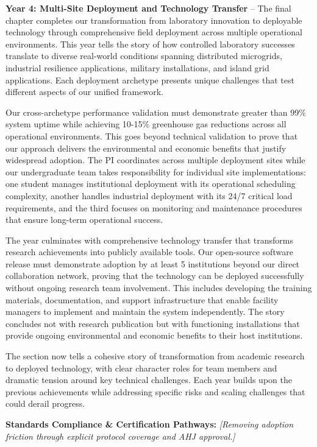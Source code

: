 \documentclass[12pt]{article}
\begin{document}
\textbf{Year 4: Multi-Site Deployment and Technology Transfer} – The final chapter completes our transformation from laboratory innovation to deployable technology through comprehensive field deployment across multiple operational environments. This year tells the story of how controlled laboratory successes translate to diverse real-world conditions spanning distributed microgrids, industrial resilience applications, military installations, and island grid applications. Each deployment archetype presents unique challenges that test different aspects of our unified framework.

Our cross-archetype performance validation must demonstrate greater than 99\% system uptime while achieving 10-15\% greenhouse gas reductions across all operational environments. This goes beyond technical validation to prove that our approach delivers the environmental and economic benefits that justify widespread adoption. The PI coordinates across multiple deployment sites while our undergraduate team takes responsibility for individual site implementations: one student manages institutional deployment with its operational scheduling complexity, another handles industrial deployment with its 24/7 critical load requirements, and the third focuses on monitoring and maintenance procedures that ensure long-term operational success.

The year culminates with comprehensive technology transfer that transforms research achievements into publicly available tools. Our open-source software release must demonstrate adoption by at least 5 institutions beyond our direct collaboration network, proving that the technology can be deployed successfully without ongoing research team involvement. This includes developing the training materials, documentation, and support infrastructure that enable facility managers to implement and maintain the system independently. The story concludes not with research publication but with functioning installations that provide ongoing environmental and economic benefits to their host institutions.

The section now tells a cohesive story of transformation from academic research to deployed technology, with clear character roles for team members and dramatic tension around key technical challenges. Each year builds upon the previous achievements while addressing specific risks and scaling challenges that could derail progress.

\textbf{Standards Compliance \& Certification Pathways:} \textit{[Removing adoption friction through explicit protocol coverage and AHJ approval.]} 
\end{document}
